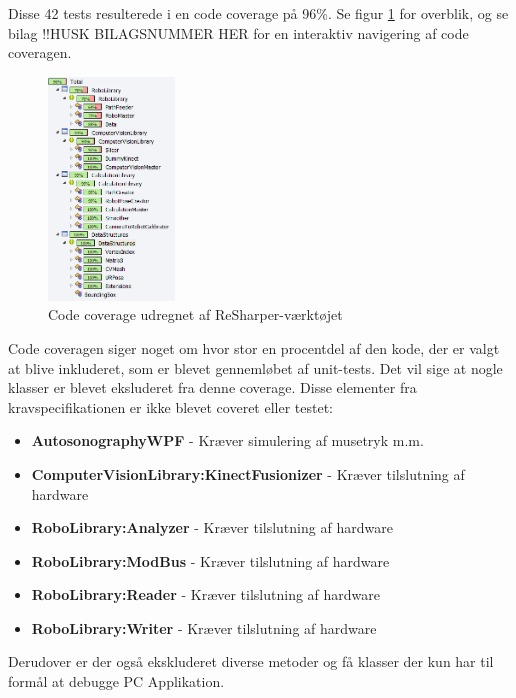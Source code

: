 Disse 42 tests resulterede i en code coverage på 96\%. Se figur \ref{CodeCoverage} for overblik, og se bilag !!HUSK BILAGSNUMMER HER for en interaktiv navigering af code coveragen. 

\begin{figure}[H]
    \centering
    \includegraphics[width=0.3\textwidth]{figurer/d/Test/coverage}
    \caption{Code coverage udregnet af ReSharper-værktøjet}
    \label{CodeCoverage}
\end{figure}

Code coveragen siger noget om hvor stor en procentdel af den kode, der er valgt at blive inkluderet, som er blevet gennemløbet af unit-tests. Det vil sige at nogle klasser er blevet eksluderet fra denne coverage. Disse elementer fra kravspecifikationen er ikke blevet coveret eller testet:
\begin{itemize}
\setlength\itemsep{0.25em}
\item{\textbf{AutosonographyWPF}} - Kræver simulering af musetryk m.m.
\item{\textbf{ComputerVisionLibrary:KinectFusionizer}} - Kræver tilslutning af hardware
\item{\textbf{RoboLibrary:Analyzer}} - Kræver tilslutning af hardware
\item{\textbf{RoboLibrary:ModBus}} - Kræver tilslutning af hardware
\item{\textbf{RoboLibrary:Reader}} - Kræver tilslutning af hardware
\item{\textbf{RoboLibrary:Writer}} - Kræver tilslutning af hardware
\end{itemize}

Derudover er der også ekskluderet diverse metoder og få klasser der kun har til formål at debugge PC Applikation.